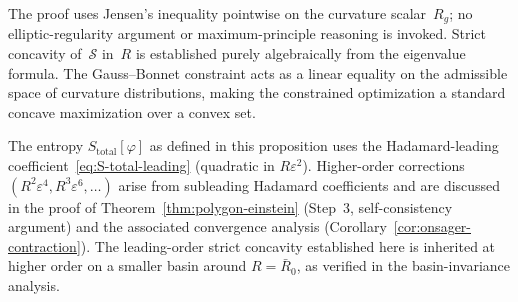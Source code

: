 \begin{remark}
The proof uses Jensen's inequality pointwise on the curvature
scalar~$R_g$; no elliptic-regularity argument or
maximum-principle reasoning is invoked.  Strict concavity
of~$\mathcal{S}$ in~$R$ is established purely algebraically
from the eigenvalue formula.  The Gauss--Bonnet constraint
acts as a linear equality on the admissible space of
curvature distributions, making the constrained optimization
a standard concave maximization over a convex set.
\end{remark}

\begin{remark}
The entropy $S_{\mathrm{total}}[\varphi]$ as defined in this
proposition uses the Hadamard-leading
coefficient~\eqref{eq:S-total-leading} (quadratic in
$R\varepsilon^2$).  Higher-order corrections
$(R^2\varepsilon^4, R^3\varepsilon^6, \ldots)$ arise from
subleading Hadamard coefficients and are discussed in the
proof of Theorem~\ref{thm:polygon-einstein} (Step~3,
self-consistency argument) and the associated convergence
analysis (Corollary~\ref{cor:onsager-contraction}).  The
leading-order strict concavity established here is
inherited at higher order on a smaller basin around
$R = \bar R_0$, as verified in the basin-invariance analysis.
\end{remark}

